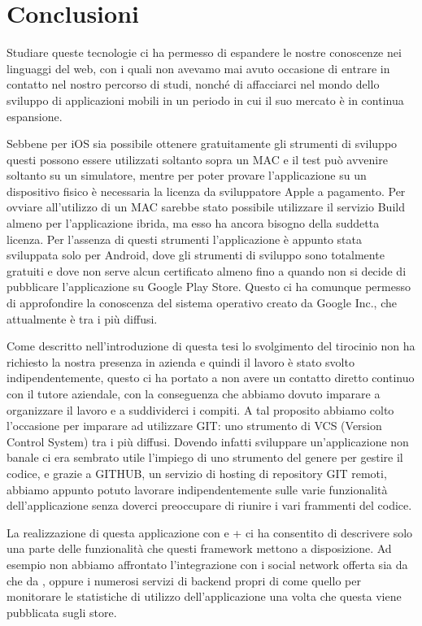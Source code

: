 \chapter{Conclusioni}
    Studiare queste tecnologie ci ha permesso di espandere le nostre
    conoscenze nei linguaggi del web, con i quali non avevamo mai avuto
    occasione di entrare in contatto nel nostro percorso di studi, nonché di
    affacciarci nel mondo dello sviluppo di applicazioni mobili in un periodo in
    cui il suo mercato è in continua espansione.

    Sebbene per iOS
    sia possibile ottenere gratuitamente gli strumenti di sviluppo questi
    possono essere utilizzati soltanto sopra un MAC e il test può avvenire
    soltanto su un simulatore, mentre per poter provare l'applicazione su un
    dispositivo fisico è necessaria la licenza da sviluppatore Apple a
    pagamento. Per ovviare all'utilizzo di un MAC sarebbe stato
    possibile utilizzare il servizio \pg{} Build almeno per l'applicazione
    ibrida, ma
    esso ha ancora bisogno della suddetta licenza. Per l'assenza di questi
    strumenti l'applicazione è appunto stata sviluppata solo per Android, dove
    gli strumenti di sviluppo sono totalmente gratuiti e dove non serve alcun
    certificato almeno fino a quando non si decide di pubblicare
    l'applicazione su Google Play Store.
    Questo ci ha comunque permesso di approfondire la
    conoscenza del sistema operativo creato da Google Inc., che attualmente è
    tra i più diffusi.

    Come descritto nell'introduzione di questa tesi lo svolgimento del
    tirocinio non ha richiesto la nostra presenza in azienda e quindi il
    lavoro è stato svolto indipendentemente, questo ci ha portato a non avere
    un contatto diretto continuo con il tutore aziendale, con la conseguenza
    che abbiamo dovuto imparare a organizzare il lavoro e a suddividerci i
    compiti. A tal proposito abbiamo colto l'occasione per imparare ad
    utilizzare GIT: uno strumento di VCS (Version Control System) tra i più
    diffusi. Dovendo infatti sviluppare un'applicazione non banale ci era
    sembrato utile l'impiego di uno strumento del genere per gestire il codice,
    e grazie a GITHUB, un servizio di hosting  di repository GIT remoti, abbiamo
    appunto potuto lavorare indipendentemente sulle varie funzionalità
    dell'applicazione senza doverci preoccupare di riunire i vari frammenti
    del codice.

    La realizzazione di questa applicazione con \tisdk{} e \pg{}+\kendomob{}
    ci ha consentito di descrivere solo una parte delle funzionalità che
    questi framework mettono a disposizione. Ad esempio non abbiamo affrontato
    l'integrazione con i social network offerta sia da \tisdk{} che da \pg{},
    oppure i numerosi servizi di backend propri di \tisdk{} come quello per
    monitorare le statistiche di utilizzo dell'applicazione una volta che
    questa viene pubblicata sugli store.


